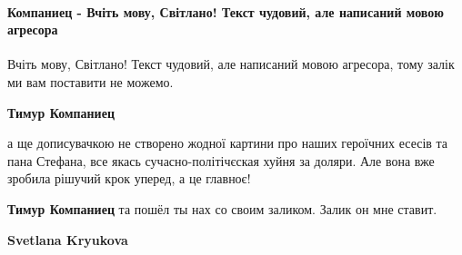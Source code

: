  
 
 
 
 
\paragraph{Компаниец - Вчіть мову, Світлано! Текст чудовий, але написаний мовою агресора}

\begin{itemize}
 
Вчіть мову, Світлано! Текст чудовий, але написаний мовою агресора, тому залік ми вам поставити не можемо.

\begin{itemize}
 
\textbf{Тимур Компаниец} 

а ще дописувачкою не створено жодної картини про наших героїчних есесів та пана
Стефана, все якась сучасно-політічєская хуйня за доляри. Але вона вже зробила
рішучий крок уперед, а це главноє!


 
\textbf{Тимур Компаниец} та пошёл ты нах со своим заликом. Залик он мне ставит.

 
\textbf{Svetlana Kryukova} 


\end{itemize}
\end{itemize}
